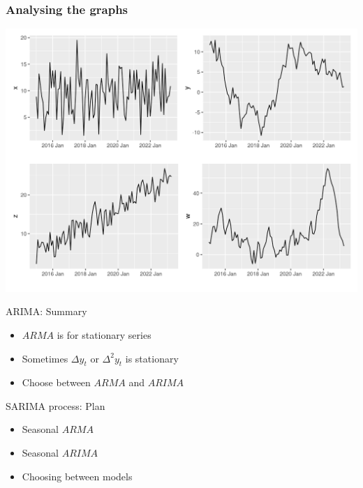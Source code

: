 \begin{frame}
	\frametitle{Analysing the graphs}
	\includegraphics[width=\textwidth]{pictures/om_ts_06-027.png}
\end{frame}


\begin{frame}{ARIMA: Summary}
	
	\begin{itemize}[<+->]
		\item $ARMA$ is for \alert{stationary} series
		\item Sometimes $\Delta y_t$ or $\Delta^2 y_t$ is stationary
		\item Choose between $ARMA$ and $ARIMA$
	\end{itemize}
\end{frame}


\begin{frame} %
	
	
\end{frame}



\begin{frame}{SARIMA process: Plan}
	\begin{itemize}[<+->]
		\item Seasonal $ARMA$

		\item Seasonal $ARIMA$
		
		\item Choosing between models
	\end{itemize}
	
\end{frame}


